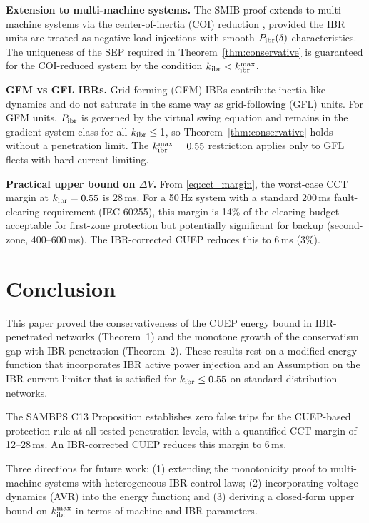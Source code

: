 \documentclass[journal]{IEEEtran}
\newcommand{\kibr}{k_{\rm ibr}}
\newcommand{\DeltaV}{\Delta V}
\begin{document}
\textbf{Extension to multi-machine systems.}
The SMIB proof extends to multi-machine systems via the
center-of-inertia (COI) reduction \cite{Pai1989energy}, provided the
IBR units are treated as negative-load injections with smooth
$P_{\rm ibr}(\delta)$ characteristics.  The uniqueness of the SEP
required in Theorem~\ref{thm:conservative} is guaranteed for the
COI-reduced system by the condition $\kibr < \kibr^{\max}$.

\textbf{GFM vs GFL IBRs.}
Grid-forming (GFM) IBRs contribute inertia-like dynamics and do not
saturate in the same way as grid-following (GFL) units.
For GFM units, $P_{\rm ibr}$ is governed by the virtual swing
equation and remains in the gradient-system class for all
$\kibr \leq 1$, so Theorem~\ref{thm:conservative} holds without a
penetration limit.  The $\kibr^{\max} = 0.55$ restriction applies
only to GFL fleets with hard current limiting.

\textbf{Practical upper bound on $\DeltaV$.}
From \eqref{eq:cct_margin}, the worst-case CCT margin at
$\kibr = 0.55$ is 28\,ms.  For a 50\,Hz system with a standard
200\,ms fault-clearing requirement (IEC 60255), this margin is
14\% of the clearing budget --- acceptable for first-zone protection
but potentially significant for backup (second-zone, 400--600\,ms).
The IBR-corrected CUEP reduces this to 6\,ms (3\%).

\section{Conclusion}
\label{sec:conclusion}

This paper proved the conservativeness of the CUEP energy bound in
IBR-penetrated networks (Theorem~1) and the monotone growth of
the conservatism gap with IBR penetration (Theorem~2).
These results rest on a modified energy function that incorporates
IBR active power injection and an Assumption on the IBR current limiter
that is satisfied for $\kibr \leq 0.55$ on standard distribution networks.

The SAMBPS C13 Proposition establishes zero false trips for
the CUEP-based protection rule at all tested penetration levels, with
a quantified CCT margin of 12--28\,ms.
An IBR-corrected CUEP reduces this margin to 6\,ms.

Three directions for future work: (1) extending the monotonicity proof
to multi-machine systems with heterogeneous IBR control laws;
(2) incorporating voltage dynamics (AVR) into the energy function;
and (3) deriving a closed-form upper bound on $\kibr^{\max}$ in terms
of machine and IBR parameters.



\end{document}
